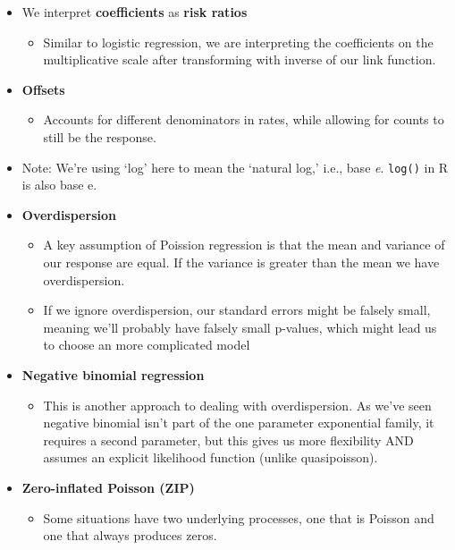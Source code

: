 \documentclass[
  openany]{book}
\providecommand{\tightlist}{%
  \setlength{\itemsep}{0pt}\setlength{\parskip}{0pt}}
\begin{document}
\begin{itemize}
\item
  We interpret \textbf{coefficients} as \textbf{risk ratios}

  \begin{itemize}
  \tightlist
  \item
    Similar to logistic regression, we are interpreting the
    coefficients on the multiplicative scale after transforming with
    inverse of our link function.
  \end{itemize}
\item
  \textbf{Offsets}

  \begin{itemize}
  \tightlist
  \item
    Accounts for different denominators in rates, while allowing for
    counts to still be the response.
  \end{itemize}
\item
  Note: We're using `log' here to mean the `natural log,' i.e., base
  \emph{e}. \texttt{log()} in R is also base e.\\
\item
  \textbf{Overdispersion}

  \begin{itemize}
  \tightlist
  \item
    A key assumption of Poission regression is that the mean and
    variance of our response are equal. If the variance is greater
    than the mean we have overdispersion.
  \item
    If we ignore overdispersion, our standard errors might be
    falsely small, meaning we'll probably have falsely small
    p-values, which might lead us to choose an more complicated
    model
  \end{itemize}
\item
  \textbf{Negative binomial regression}

  \begin{itemize}
  \tightlist
  \item
    This is another approach to dealing with overdispersion. As
    we've seen negative binomial isn't part of the one parameter
    exponential family, it requires a second parameter, but this
    gives us more flexibility AND assumes an explicit likelihood
    function (unlike quasipoisson).
  \end{itemize}
\item
  \textbf{Zero-inflated Poisson (ZIP)}

  \begin{itemize}
  \tightlist
  \item
    Some situations have two underlying processes, one that is
    Poisson and one that always produces zeros.
  \end{itemize}
\end{itemize}
\end{document}
